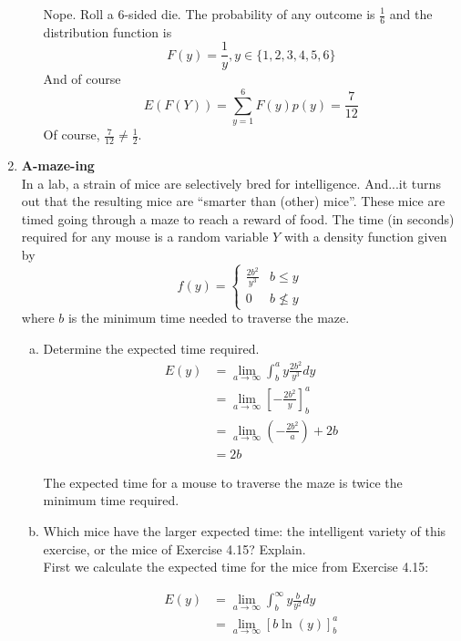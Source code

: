 \documentclass{scrartcl}
\begin{document}
\begin{enumerate}
\begin{enumerate}[a)]
    Nope. Roll a 6-sided die. The probability of any outcome is $\frac{1}{6}$ and the distribution function is $$F(y) = \frac{1}{y} , y\in\{1,2,3,4,5,6\}$$ And of course $$E(F(Y)) = \sum_{y=1}^6F(y)p(y) = \frac{7}{12}$$ Of course, $\frac{7}{12} \ne \frac{1}{2}$.

  \end{enumerate}

\item \textbf{A-maze-ing}\\

  In a lab, a strain of mice are selectively bred for intelligence. And...it turns out that the resulting mice are “smarter than (other) mice”. These mice are timed going through a maze to reach a reward of food. The time (in seconds) required for any mouse is a random variable $Y$ with a density function given by
  \begin{displaymath}
    f(y) = \begin{cases} 
      \frac{2b^2}{y^3} & b \le y \\
      0 & b \nleq y
    \end{cases}
  \end{displaymath}
  where $b$ is the minimum time needed to traverse the maze.

  \begin{enumerate}[a)]
  \item Determine the expected time required.\\

    \begin{align*}
      E(y) &= \lim_{a\rightarrow\infty}\int_b^a y\frac{2b^2}{y^3} dy\\
      &= \lim_{a\rightarrow\infty}\left[-\frac{2b^2}{y}\right]_b^a\\
      &= \lim_{a\rightarrow\infty}\left(-\frac{2b^2}{a}\right) + 2b\\
      &= 2b
    \end{align*}

    The expected time for a mouse to traverse the maze is twice the minimum time required.\\

  \item Which mice have the larger expected time: the intelligent variety of this exercise, or the mice of Exercise 4.15? Explain.\\

    First we calculate the expected time for the mice from Exercise 4.15:

    \begin{align*}
      E(y) &= \lim_{a\rightarrow\infty}\int_b^\infty y\frac{b}{y^2} dy\\
      &= \lim_{a\rightarrow\infty}\left[b\ln(y)\right]_b^a\\
    \end{align*}


\end{enumerate}
\end{enumerate}
\end{document}
